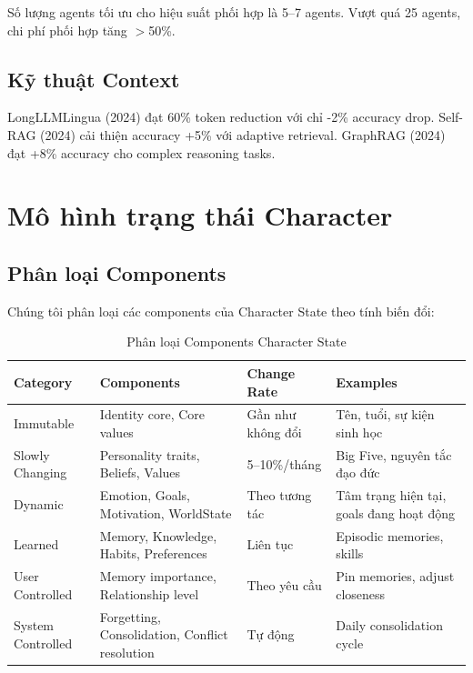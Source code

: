 \documentclass[10pt,leqno]{amsart}
\begin{document}
Số lượng agents tối ưu cho hiệu suất phối hợp là 5--7 agents. Vượt quá 25 agents, chi phí phối hợp tăng $>$50\%.

\subsection{Kỹ thuật Context}

LongLLMLingua (2024) đạt 60\% token reduction với chỉ -2\% accuracy drop. Self-RAG (2024) cải thiện accuracy +5\% với adaptive retrieval. GraphRAG (2024) đạt +8\% accuracy cho complex reasoning tasks.


\section{Mô hình trạng thái Character}

\subsection{Phân loại Components}

Chúng tôi phân loại các components của Character State theo tính biến đổi:

\begin{table}[H]
\centering
\caption{Phân loại Components Character State}
\label{tab:state-components}
\begin{tabular}{llll}
\toprule
\textbf{Category} & \textbf{Components} & \textbf{Change Rate} & \textbf{Examples} \\
\midrule
Immutable & Identity core, Core values & Gần như không đổi & Tên, tuổi, sự kiện sinh học \\
Slowly Changing & Personality traits, Beliefs, Values & 5--10\%/tháng & Big Five, nguyên tắc đạo đức \\
Dynamic & Emotion, Goals, Motivation, WorldState & Theo tương tác & Tâm trạng hiện tại, goals đang hoạt động \\
Learned & Memory, Knowledge, Habits, Preferences & Liên tục & Episodic memories, skills \\
User Controlled & Memory importance, Relationship level & Theo yêu cầu & Pin memories, adjust closeness \\
System Controlled & Forgetting, Consolidation, Conflict resolution & Tự động & Daily consolidation cycle \\
\bottomrule
\end{tabular}
\end{table}
\end{document}
